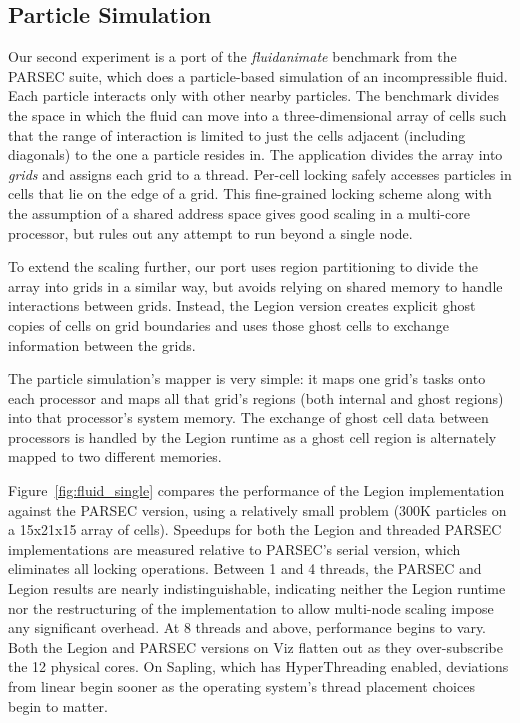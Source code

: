 \subsection{Particle Simulation}
\label{subsec:exp_fluid}

Our second experiment is a port of the \emph{fluidanimate} benchmark
from the PARSEC suite\cite{bienia11benchmarking}, which does a
particle-based simulation of an incompressible fluid.  Each particle
interacts only with other nearby particles. The benchmark divides the
space in which the fluid can move into a three-dimensional array of
cells such that the range of interaction is limited to just the cells
adjacent (including diagonals) to the one a particle resides in.  The
application divides the array into {\em grids} and assigns each grid to
a thread.  Per-cell locking safely accesses particles in
cells that lie on the edge of a grid.  This fine-grained locking
scheme along with the assumption of a shared address space gives
good scaling in a multi-core processor, but rules out any attempt to run
beyond a single node.

To extend the scaling further, our port uses region partitioning to
divide the array into grids in a similar way, but avoids relying
on shared memory to handle interactions between grids.
Instead, the Legion version creates
explicit ghost copies of cells on grid boundaries and uses
those ghost cells to exchange information between the grids.

The particle simulation's mapper is very simple: it maps one grid's
tasks onto each processor and maps all that grid's regions (both
internal and ghost regions) into that processor's system memory.  The
exchange of ghost cell data between processors is handled by the
Legion runtime as a ghost cell region is alternately mapped to two
different memories.

Figure~\ref{fig:fluid_single} compares the performance of the Legion
implementation against the PARSEC version, using a relatively small
problem (300K particles on a 15x21x15 array of cells).  Speedups for
both the Legion and threaded PARSEC implementations are measured 
relative to PARSEC's serial version, which eliminates all locking
operations.  Between 1 and
4 threads, the PARSEC and Legion results are nearly indistinguishable,
indicating neither the Legion runtime nor the restructuring of the
implementation to allow multi-node scaling impose any significant
overhead.
At 8 threads and above, performance begins to vary.  Both the Legion
and PARSEC versions on Viz flatten out as they over-subscribe the 12
physical cores.  On Sapling, which has HyperThreading enabled,
deviations from linear begin sooner as the operating system's
thread placement choices begin to matter.

